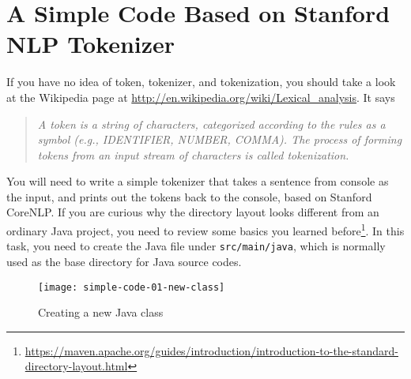 
\section{A Simple Code Based on Stanford NLP Tokenizer}

If you have no idea of token, tokenizer, and tokenization, you should take a
look at the Wikipedia page at
\url{http://en.wikipedia.org/wiki/Lexical_analysis}. It says

\begin{quote}
\emph{A token is a string of characters, categorized according to the rules
as a symbol (e.g., IDENTIFIER, NUMBER, COMMA). The process of forming tokens
from an input stream of characters is called tokenization.}
\end{quote}

You will need to write a simple tokenizer that takes a sentence from console as
the input, and prints out the tokens back to the console, based on Stanford
CoreNLP. If you are curious why the directory layout looks different from an
ordinary Java project, you need to review some basics you learned
before\footnote{\url{https://maven.apache.org/guides/introduction/introduction-to-the-standard-directory-layout.html}}.
In this task, you need to create the Java file under \texttt{src/main/java},
which is normally used as the base directory for Java source codes.

\begin{figure}
\centering
\texttt{[image: simple-code-01-new-class]}
\caption{Creating a new Java class\label{simple-code-01-new-class}}
\end{figure}

